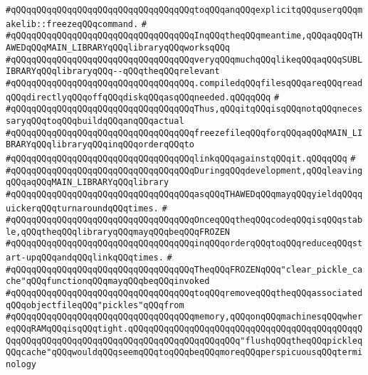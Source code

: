 \verb|#qQQqqQQqqQQqqQQqqQQqqQQqqQQqqQQqqQQqtoqQQqanqQQqexplicitqQQquserqQQqmakelib::freezeqQQqcommand.|\newline
\verb|#|\newline
\verb|#qQQqqQQqqQQqqQQqqQQqqQQqqQQqqQQqqQQqInqQQqtheqQQqmeantime,qQQqaqQQqTHAWEDqQQqMAIN_LIBRARYqQQqlibraryqQQqworksqQQq|\newline
\verb|#qQQqqQQqqQQqqQQqqQQqqQQqqQQqqQQqqQQqveryqQQqmuchqQQqlikeqQQqaqQQqSUBLIBRARYqQQqlibraryqQQq--qQQqtheqQQqrelevant|\newline
\verb|#qQQqqQQqqQQqqQQqqQQqqQQqqQQqqQQqqQQq.compiledqQQqfilesqQQqareqQQqreadqQQqdirectlyqQQqoffqQQqdiskqQQqasqQQqneeded.qQQqqQQq|\newline
\verb|#|\newline
\verb|#qQQqqQQqqQQqqQQqqQQqqQQqqQQqqQQqqQQqThus,qQQqitqQQqisqQQqnotqQQqnecessaryqQQqtoqQQqbuildqQQqanqQQqactual|\newline
\verb|#qQQqqQQqqQQqqQQqqQQqqQQqqQQqqQQqqQQqfreezefileqQQqforqQQqaqQQqMAIN_LIBRARYqQQqlibraryqQQqinqQQqorderqQQqto|\newline
\verb|#qQQqqQQqqQQqqQQqqQQqqQQqqQQqqQQqqQQqlinkqQQqagainstqQQqit.qQQqqQQq|\newline
\verb|#|\newline
\verb|#qQQqqQQqqQQqqQQqqQQqqQQqqQQqqQQqqQQqDuringqQQqdevelopment,qQQqleavingqQQqaqQQqMAIN_LIBRARYqQQqlibrary|\newline
\verb|#qQQqqQQqqQQqqQQqqQQqqQQqqQQqqQQqqQQqasqQQqTHAWEDqQQqmayqQQqyieldqQQqquickerqQQqturnaroundqQQqtimes.|\newline
\verb|#|\newline
\verb|#qQQqqQQqqQQqqQQqqQQqqQQqqQQqqQQqqQQqOnceqQQqtheqQQqcodeqQQqisqQQqstable,qQQqtheqQQqlibraryqQQqmayqQQqbeqQQqFROZEN|\newline
\verb|#qQQqqQQqqQQqqQQqqQQqqQQqqQQqqQQqqQQqinqQQqorderqQQqtoqQQqreduceqQQqstart-upqQQqandqQQqlinkqQQqtimes.|\newline
\verb|#|\newline
\verb|#qQQqqQQqqQQqqQQqqQQqqQQqqQQqqQQqqQQqTheqQQqFROZENqQQq"clear_pickle_cache"qQQqfunctionqQQqmayqQQqbeqQQqinvoked|\newline
\verb|#qQQqqQQqqQQqqQQqqQQqqQQqqQQqqQQqqQQqtoqQQqremoveqQQqtheqQQqassociatedqQQqobjectfileqQQq"pickles"qQQqfrom|\newline
\verb|#qQQqqQQqqQQqqQQqqQQqqQQqqQQqqQQqqQQqmemory,qQQqonqQQqmachinesqQQqwhereqQQqRAMqQQqisqQQqtight.qQQqqQQqqQQqqQQqqQQqqQQqqQQqqQQqqQQqqQQqqQQqqQQqqQQqqQQqqQQqqQQqqQQqqQQqqQQqqQQqqQQqqQQqqQQq"flushqQQqtheqQQqpickleqQQqcache"qQQqwouldqQQqseemqQQqtoqQQqbeqQQqmoreqQQqperspicuousqQQqterminology|\newline
